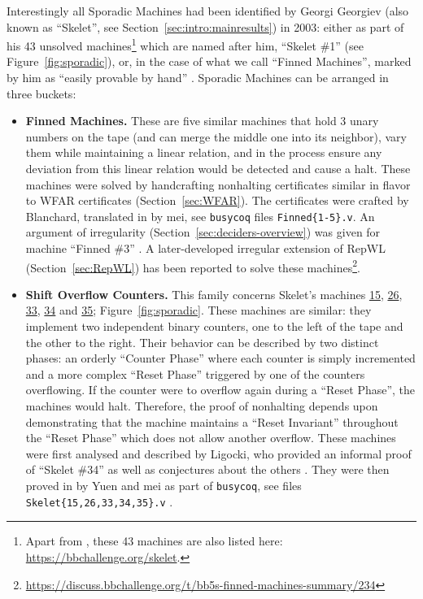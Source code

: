 Interestingly all Sporadic Machines had been identified by Georgi Georgiev (also known as ``Skelet'', see Section~\ref{sec:intro:mainresults}) in 2003: either as part of his 43 unsolved machines\footnote{Apart from \cite{Skelet_bbfind_list}, these 43 machines are also listed here: \url{https://bbchallenge.org/skelet}.} which are named after him, \eg ``Skelet \#1'' (see Figure~\ref{fig:sporadic}), or, in the case of what we call ``Finned Machines'', marked by him as ``easily provable by hand'' \cite{Skelet_bbfind_list}. Sporadic Machines can be arranged in three buckets:
\begin{itemize}
    \item \textbf{Finned Machines.} These are five similar machines that hold 3 unary numbers on the tape (and can merge the middle one into its neighbor), vary them while maintaining a linear relation, and in the process ensure any deviation from this linear relation would be detected and cause a halt. These machines were solved by handcrafting nonhalting certificates similar in flavor to WFAR certificates (Section~\ref{sec:WFAR}). The certificates were crafted by Blanchard, translated in \Coq by mei, see \texttt{busycoq} files \texttt{Finned\{1-5\}.v}. An argument of irregularity (Section~\ref{sec:deciders-overview}) was given for machine ``Finned \#3'' \cite{irregularFinned3}. A later-developed irregular extension of RepWL (Section~\ref{sec:RepWL}) has been reported to solve these machines\footnote{\url{https://discuss.bbchallenge.org/t/bb5s-finned-machines-summary/234}}.
    \item \textbf{Shift Overflow Counters.} This family concerns Skelet's machines \href{https://bbchallenge.org/1RB---_1RC1LB_1LD1RE_1LB0LD_1RA0RC}{15}, \href{https://bbchallenge.org/1RB1LD_1RC0RB_1LA1RC_1LE0LA_1LC---}{26}, \href{https://bbchallenge.org/1RB1LC_0RC0RB_1LD0LA_1LE---_1LA1RE}{33}, \href{https://bbchallenge.org/1RB1LC_0RC0RB_1LD0LA_1LE---_1LA1RA}{34} and \href{https://bbchallenge.org/1RB1LC_0RC0RB_1LD0LA_1LE---_1LA0LA}{35}; Figure~\ref{fig:sporadic}. These machines are similar: they implement two independent binary counters, one to the left of the tape and the other to the right. Their behavior can be described by two distinct phases: an orderly ``Counter Phase'' where each counter is simply incremented and a more complex ``Reset Phase'' triggered by one of the counters overflowing. If the counter were to overflow again during a ``Reset Phase'', the machines would halt. Therefore, the proof of nonhalting depends upon demonstrating that the machine maintains a ``Reset Invariant'' throughout the ``Reset Phase'' which does not allow another overflow. These machines were first analysed and described by Ligocki, who provided an informal proof of ``Skelet \#34'' as well as conjectures about the others \cite{ShawnSOC}. They were then proved in \Coq by Yuen and mei as part of \texttt{busycoq}, see files \texttt{Skelet\{15,26,33,34,35\}.v} \cite{busycoq}.

\end{itemize}
